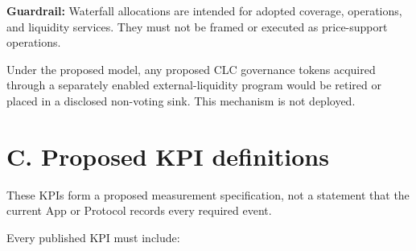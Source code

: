 \documentclass[11pt]{article}
\begin{document}
\textbf{Guardrail:} Waterfall allocations are intended for adopted coverage, operations, and liquidity services. They must not be framed or executed as price-support operations.

Under the proposed model, any proposed CLC governance tokens acquired through a separately enabled external-liquidity program would be retired or placed in a disclosed non-voting sink. This mechanism is not deployed.


\section*{C. Proposed KPI definitions}

These KPIs form a proposed measurement specification, not a statement that the current App or Protocol records every required event.

Every published KPI must include:
\end{document}

